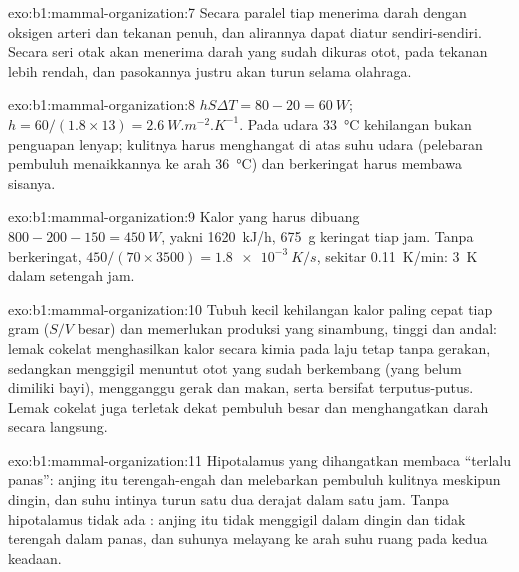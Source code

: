 \begin{solution}{exo:b1:mammal-organization:7}
Secara paralel tiap  menerima darah dengan oksigen arteri dan
tekanan penuh, dan alirannya dapat diatur sendiri-sendiri. Secara seri
otak akan menerima darah yang sudah dikuras otot, pada tekanan lebih
rendah, dan pasokannya justru akan turun selama olahraga.
\end{solution}

\begin{solution}{exo:b1:mammal-organization:8}
$hS\Delta T = 80 - 20 = \qty{60}{W}$; $h = 60/(1.8\times 13) =
\qty{2.6}{W.m^{-2}.K^{-1}}$. Pada udara \qty{33}{\celsius} kehilangan
bukan penguapan lenyap; kulitnya harus menghangat di atas suhu udara
(pelebaran pembuluh menaikkannya ke arah \qty{36}{\celsius}) dan
berkeringat harus membawa sisanya.
\end{solution}

\begin{solution}{exo:b1:mammal-organization:9}
Kalor yang harus dibuang $800 - 200 - 150 = \qty{450}{W}$, yakni
\qty{1620}{kJ/h}, \qty{675}{g} keringat tiap jam. Tanpa berkeringat,
$450/(70\times 3500) =
\qty{1.8e-3}{K/s}$, sekitar \qty{0.11}{K/min}: \qty{3}{K} dalam setengah jam.
\end{solution}

\begin{solution}{exo:b1:mammal-organization:10}
Tubuh kecil kehilangan kalor paling cepat tiap gram ($S/V$ besar) dan
memerlukan produksi yang sinambung, tinggi dan andal: lemak cokelat
menghasilkan kalor secara kimia pada laju tetap tanpa gerakan,
sedangkan menggigil menuntut otot yang sudah berkembang (yang belum
dimiliki bayi), mengganggu gerak dan makan, serta bersifat
terputus-putus. Lemak cokelat juga terletak dekat pembuluh besar dan
menghangatkan darah secara langsung.
\end{solution}

\begin{solution}{exo:b1:mammal-organization:11}
Hipotalamus yang dihangatkan membaca ``terlalu panas'': anjing itu
terengah-engah dan melebarkan pembuluh kulitnya meskipun dingin, dan
suhu intinya turun satu dua derajat dalam satu jam. Tanpa hipotalamus
tidak ada : anjing itu tidak menggigil dalam dingin dan tidak
terengah dalam panas, dan suhunya melayang ke arah suhu ruang pada kedua
keadaan.
\end{solution}

